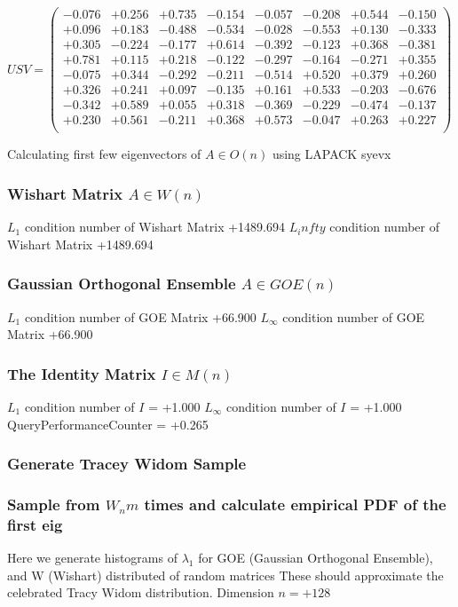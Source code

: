 \documentclass[9pt]{article}
\theoremstyle{plain}
\theoremstyle{definition}
\theoremstyle{remark}
\numberwithin{equation}{section}
\begin{document}
$U S V = \left(
\begin{array}{
cccccccc}
-0.076 & +0.256 & +0.735 & -0.154 & -0.057 & -0.208 & +0.544 & -0.150 \\
+0.096 & +0.183 & -0.488 & -0.534 & -0.028 & -0.553 & +0.130 & -0.333 \\
+0.305 & -0.224 & -0.177 & +0.614 & -0.392 & -0.123 & +0.368 & -0.381 \\
+0.781 & +0.115 & +0.218 & -0.122 & -0.297 & -0.164 & -0.271 & +0.355 \\
-0.075 & +0.344 & -0.292 & -0.211 & -0.514 & +0.520 & +0.379 & +0.260 \\
+0.326 & +0.241 & +0.097 & -0.135 & +0.161 & +0.533 & -0.203 & -0.676 \\
-0.342 & +0.589 & +0.055 & +0.318 & -0.369 & -0.229 & -0.474 & -0.137 \\
+0.230 & +0.561 & -0.211 & +0.368 & +0.573 & -0.047 & +0.263 & +0.227 \\
\end{array}
\right)$ \newline 

Calculating first few eigenvectors of $A \in O(n)$ using LAPACK syevx

\subsubsection{Wishart Matrix $A \in W(n)$}
$L_1$ condition number of Wishart Matrix +1489.694
$L_infty$ condition number of Wishart Matrix +1489.694
\subsubsection{Gaussian Orthogonal Ensemble $A \in GOE(n)$}
$L_1$ condition number of GOE Matrix +66.900
$L_\infty$ condition number of GOE Matrix +66.900
\subsubsection{The Identity Matrix $I \in M(n)$}
$L_1$ condition number of $I$ = +1.000
$L_\infty$ condition number of $I$ = +1.000
QueryPerformanceCounter  =  +0.265
\subsubsection{Generate Tracey Widom Sample}
\subsubsection{Sample from $W_n m$ times and calculate empirical PDF of the first eig}
Here we generate histograms of $\lambda_1$ for GOE (Gaussian Orthogonal Ensemble), and W (Wishart) 		 distributed of random matrices
These should approximate the celebrated Tracy Widom distribution.
Dimension $n = +128$
\end{document}
